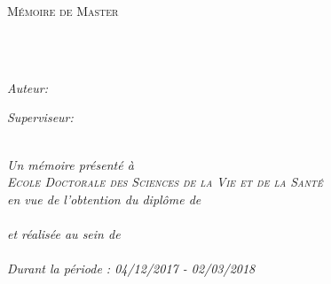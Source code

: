 \documentclass[
12pt, %
oneside, %
english, %
doublespacing, %
headsepline, %
chapterinoneline, %
]{MastersDoctoralThesis} %
\author{Pierre \textsc{Albigès}} %
\begin{document}
\frontmatter %

\pagestyle{plain} %


\begin{titlepage}
\begin{center}

{\scshape\LARGE \univname\par}\vspace{1.5cm} %
\textsc{\Large Mémoire de Master}\\[0.5cm] %

\HRule \\[0.4cm] %
{\huge \bfseries \ttitle\par}\vspace{0.4cm} %
\HRule \\[1.5cm] %
 
\begin{minipage}[t]{0.4\textwidth}
\begin{flushleft} \large
\emph{Auteur:}\\
\href{https://github.com/pierrealbiges}{\authorname} %
\end{flushleft}
\end{minipage}
\begin{minipage}[t]{0.4\textwidth}
\begin{flushright} \large
\emph{Superviseur:} \\
\href{http://emmanuel.dauce.free.fr/}{\supname} %
\end{flushright}
\end{minipage}\\[3cm]

\vfill
\large \textit{Un mémoire présenté à\\ \textsc{Ecole Doctorale des Sciences de la Vie et de la Santé}\\en vue de l'obtention du diplôme de\\ \textsc{\degreename}}\\[0.3cm] %
\textit{et réalisée au sein de}\\[0.4cm]
\groupname\\[2cm] %
\small \textit{Durant la période : 04/12/2017 - 02/03/2018}\\[4cm] %

\end{center}
\end{titlepage}
\end{document}
